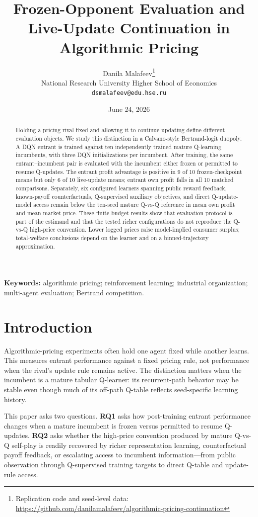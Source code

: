 \documentclass[11pt]{article}
\title{Frozen-Opponent Evaluation and Live-Update Continuation in Algorithmic Pricing}
\author{Danila Malafeev\thanks{Replication code and seed-level data: \url{https://github.com/danilamalafeev/algorithmic-pricing-continuation}}\\
National Research University Higher School of Economics\\
\texttt{dsmalafeev@edu.hse.ru}}
\date{June 24, 2026}
\begin{document}
\maketitle

\begin{abstract}
Holding a pricing rival fixed and allowing it to continue updating define
different evaluation objects. We study this distinction in a Calvano-style
Bertrand-logit duopoly. A DQN entrant is trained against ten independently
trained mature Q-learning incumbents, with three DQN initializations per
incumbent. After training, the same entrant--incumbent pair is evaluated with
the incumbent either frozen or permitted to resume Q-updates. The entrant
profit advantage is positive in 9 of 10 frozen-checkpoint means but only 6 of
10 live-update means; entrant own profit falls in all 10 matched comparisons.
Separately, six configured learners spanning public reward feedback,
known-payoff counterfactuals, Q-supervised auxiliary objectives, and direct
Q-update-model access remain below the ten-seed mature Q-vs-Q reference in
mean own profit and mean market price. These finite-budget results show that
evaluation protocol is part of the estimand and that the tested richer
configurations do not reproduce the Q-vs-Q high-price convention. Lower
logged prices raise model-implied consumer surplus; total-welfare conclusions
depend on the learner and on a binned-trajectory approximation.
\end{abstract}

\noindent\textbf{Keywords:} algorithmic pricing; reinforcement learning;
industrial organization; multi-agent evaluation; Bertrand competition.

\section{Introduction}

Algorithmic-pricing experiments often hold one agent fixed while another
learns. This measures entrant performance against a fixed pricing rule, not
performance when the rival's update rule remains active. The distinction
matters when the incumbent is a mature tabular Q-learner: its recurrent-path
behavior may be stable even though much of its off-path Q-table reflects
seed-specific learning history.

This paper asks two questions. \textbf{RQ1} asks how post-training entrant
performance changes when a mature incumbent is frozen versus permitted to
resume Q-updates. \textbf{RQ2} asks whether the high-price convention produced by mature
Q-vs-Q self-play is readily recovered by richer representation learning,
counterfactual payoff feedback, or escalating access to incumbent
information---from public observation through Q-supervised training targets
to direct Q-table and update-rule access.
\end{document}
